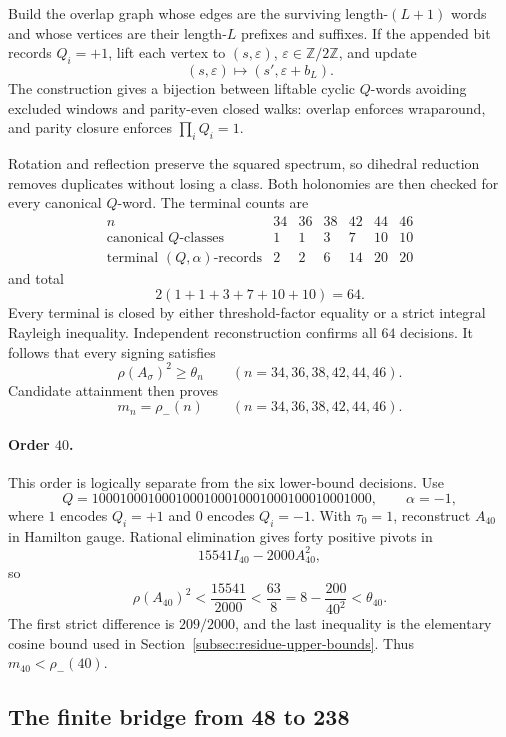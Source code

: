 Build the overlap graph whose edges are the surviving length-\((L+1)\)
words and whose vertices are their length-\(L\) prefixes and suffixes.
If the appended bit records \(Q_i=+1\), lift each vertex to
\((s,\varepsilon)\), \(\varepsilon\in\mathbb Z/2\mathbb Z\), and update
\[
(s,\varepsilon)\longmapsto(s',\varepsilon+b_L).
\]
The construction gives a bijection between liftable cyclic \(Q\)-words
avoiding excluded windows and parity-even closed walks: overlap enforces
wraparound, and parity closure enforces \(\prod_iQ_i=1\).

Rotation and reflection preserve the squared spectrum, so dihedral reduction
removes duplicates without losing a class.  Both holonomies are then checked
for every canonical \(Q\)-word. The terminal counts are
\[
\begin{array}{c|rrrrrr}
n&34&36&38&42&44&46\\ \hline
\text{canonical \(Q\)-classes}&1&1&3&7&10&10\\
\text{terminal \((Q,\alpha)\)-records}&2&2&6&14&20&20
\end{array}
\]
and total
\[
2(1+1+3+7+10+10)=64.
\]
Every terminal is closed by either threshold-factor equality or a
strict integral Rayleigh inequality.  Independent reconstruction confirms
all \(64\) decisions.
It follows that every signing satisfies
\[
\rho(A_\sigma)^2\geq\theta_n
\qquad(n=34,36,38,42,44,46).
\]
Candidate attainment then proves
\[
m_n=\rho_-(n)
\qquad(n=34,36,38,42,44,46).
\]

\paragraph{Order \(40\).}
This order is logically separate from the six lower-bound decisions.  Use
\[
Q=1000100010001000100010001000100010001000,
\qquad \alpha=-1,
\]
where \(1\) encodes \(Q_i=+1\) and \(0\) encodes \(Q_i=-1\).  With
\(\tau_0=1\), reconstruct \(A_{40}\) in Hamilton gauge. Rational elimination
gives forty positive pivots in
\[
15541I_{40}-2000A_{40}^2,
\]
so
\[
\rho(A_{40})^2<\frac{15541}{2000}
<\frac{63}{8}
=8-\frac{200}{40^2}<\theta_{40}.
\]
The first strict difference is \(209/2000\), and the last inequality is the
elementary cosine bound used in Section~\ref{subsec:residue-upper-bounds}.
Thus \(m_{40}<\rho_-(40)\).

\subsection{The finite bridge from 48 to 238}
\label{subsec:exact-bridge-48-238}

